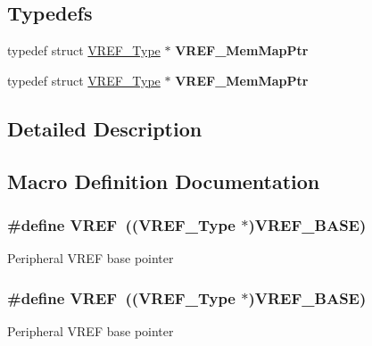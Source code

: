 \subsection*{Typedefs}
\begin{DoxyCompactItemize}
\item 
typedef struct \hyperlink{structVREF__Type}{V\+R\+E\+F\+\_\+\+Type} $\ast$ {\bfseries V\+R\+E\+F\+\_\+\+Mem\+Map\+Ptr}\hypertarget{group__VREF__Peripheral__Access__Layer_gaad463405bed02131f9a854aeb0665978}{}\label{group__VREF__Peripheral__Access__Layer_gaad463405bed02131f9a854aeb0665978}

\item 
typedef struct \hyperlink{structVREF__Type}{V\+R\+E\+F\+\_\+\+Type} $\ast$ {\bfseries V\+R\+E\+F\+\_\+\+Mem\+Map\+Ptr}\hypertarget{group__VREF__Peripheral__Access__Layer_gaad463405bed02131f9a854aeb0665978}{}\label{group__VREF__Peripheral__Access__Layer_gaad463405bed02131f9a854aeb0665978}

\end{DoxyCompactItemize}


\subsection{Detailed Description}


\subsection{Macro Definition Documentation}
\subsubsection[{\texorpdfstring{V\+R\+EF}{VREF}}]{\setlength{\rightskip}{0pt plus 5cm}\#define V\+R\+EF~(({\bf V\+R\+E\+F\+\_\+\+Type} $\ast$){\bf V\+R\+E\+F\+\_\+\+B\+A\+SE})}\hypertarget{group__VREF__Peripheral__Access__Layer_ga2c9e85d22a9ba37ea589b1747af46307}{}\label{group__VREF__Peripheral__Access__Layer_ga2c9e85d22a9ba37ea589b1747af46307}
Peripheral V\+R\+EF base pointer 
\subsubsection[{\texorpdfstring{V\+R\+EF}{VREF}}]{\setlength{\rightskip}{0pt plus 5cm}\#define V\+R\+EF~(({\bf V\+R\+E\+F\+\_\+\+Type} $\ast$){\bf V\+R\+E\+F\+\_\+\+B\+A\+SE})}\hypertarget{group__VREF__Peripheral__Access__Layer_ga2c9e85d22a9ba37ea589b1747af46307}{}\label{group__VREF__Peripheral__Access__Layer_ga2c9e85d22a9ba37ea589b1747af46307}
Peripheral V\+R\+EF base pointer 
